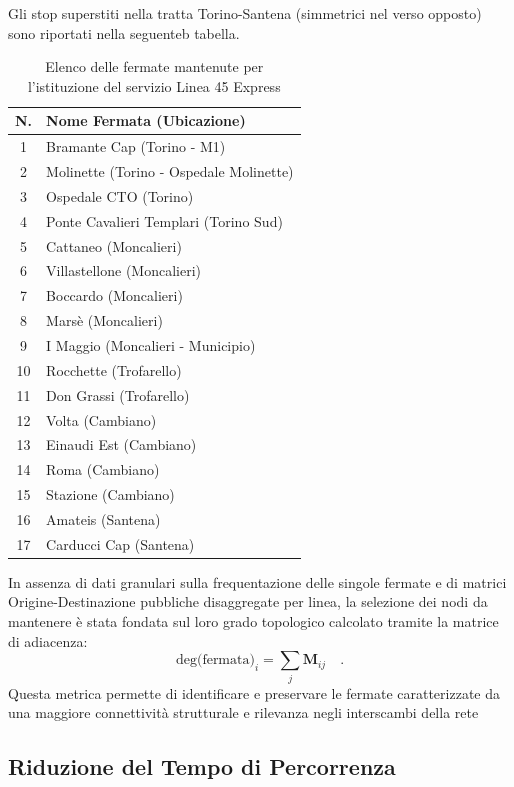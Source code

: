 \documentclass[conference]{IEEEtran}
\begin{document}
Gli stop superstiti nella tratta Torino-Santena (simmetrici nel verso opposto) sono riportati nella seguenteb tabella.
\begin{table}[htbp]
\caption{Elenco delle fermate mantenute per l'istituzione del servizio Linea 45 Express}
\label{tab:fermate_express}
\centering
\renewcommand{\arraystretch}{1.15}
\begin{tabular}{@{}cl@{}}
\toprule
\textbf{N.} & \textbf{Nome Fermata (Ubicazione)} \\
\midrule
1  & Bramante Cap (Torino - M1) \\
2  & Molinette (Torino - Ospedale Molinette) \\
3  & Ospedale CTO (Torino) \\
4  & Ponte Cavalieri Templari (Torino Sud) \\
5  & Cattaneo (Moncalieri) \\
6  & Villastellone (Moncalieri) \\
7  & Boccardo (Moncalieri) \\
8  & Marsè (Moncalieri) \\
9  & I Maggio (Moncalieri - Municipio) \\
10 & Rocchette (Trofarello) \\
11 & Don Grassi (Trofarello) \\
12 & Volta (Cambiano) \\
13 & Einaudi Est (Cambiano) \\
14 & Roma (Cambiano) \\
15 & Stazione (Cambiano) \\
16 & Amateis (Santena) \\
17 & Carducci Cap (Santena) \\
\bottomrule
\end{tabular}
\end{table}

In assenza di dati granulari sulla frequentazione delle singole fermate e di matrici Origine-Destinazione pubbliche disaggregate per linea, la selezione dei nodi da mantenere è stata fondata sul loro grado topologico calcolato tramite la matrice di adiacenza:
\begin{equation}
      \text{deg(fermata)}_i = \sum_j \mathbf{M}_{ij} \quad.
\end{equation}
Questa metrica permette di identificare e preservare le fermate caratterizzate da una maggiore connettività strutturale e rilevanza negli interscambi della rete

\subsection{Riduzione del Tempo di Percorrenza}
\end{document}
